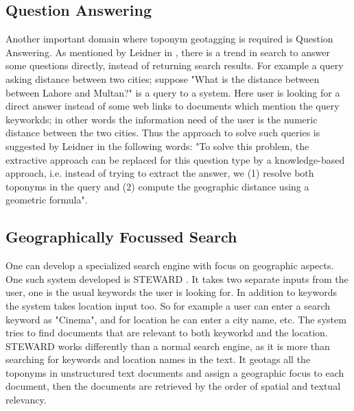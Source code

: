 \documentclass[
     11pt,         %
     a4paper,      %
     oneside,
     ]{article}
\begin{document}
\subsection{Question Answering} 
Another important domain where toponym geotagging is required is Question Answering. As mentioned by Leidner in 
\cite{Leidner:2008:PhD}, there is a trend in search to answer some questions directly, instead of returning search results. For example a query asking distance between two cities; suppose "What is the distance between between Lahore and Multan?" is a query to a system. Here user is looking for a direct answer instead of some web links to documents which mention the query keyworkds; in other words the information need of the user is the numeric distance between the two cities. Thus the approach to solve such queries is suggested by Leidner \cite{Leidner:2008:PhD} in the following words: "To solve this problem, the extractive approach can be replaced for this question type by a knowledge-based approach, i.e. instead of trying to extract the answer, we (1) resolve both toponyms in the query and (2) compute the geographic distance using a geometric formula".

\subsection{Geographically Focussed Search} 
One can develop a specialized search engine with focus on geographic aspects. One such system developed is STEWARD \cite{Lieberman:2007:SAS:1341012.1341045}. It takes two separate inputs from the user, one is the usual keywords the user is looking for. In addition to keywords the system takes location input too. So for example a user can enter a search keyword as "Cinema", and for location he can enter a city name, etc. The system tries to find documents that are relevant to both keyworkd and the location. STEWARD works differently than a normal search engine, as it is more than searching for keywords and location names in the text. It geotags all the toponyms in unstructured text documents and assign a geographic focus to each document, then the documents are retrieved by the order of spatial and textual relevancy. 
\end{document}
